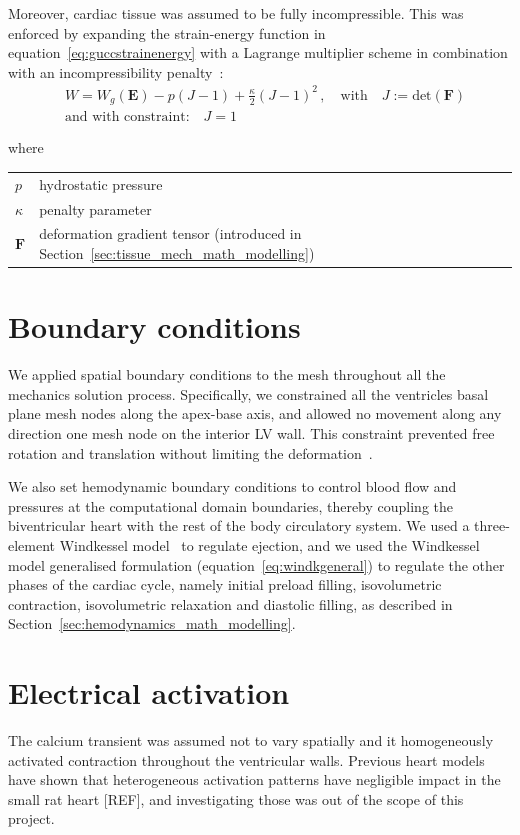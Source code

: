 \vspace{0.3cm}\noindent
Moreover, cardiac tissue was assumed to be fully incompressible. This was enforced by expanding the strain-energy function in equation~\eqref{eq:guccstrainenergy} with a Lagrange multiplier scheme in combination with an incompressibility penalty~\cite{Land:2015*b}:
%
\begin{align}\label{eq:landstrainenergy}
    &W = W_g(\mathbf{E}) - p(J - 1) + \frac{\kappa}{2}(J - 1)^2\,,\quad\text{with}\quad J:=\text{det}(\mathbf{F}) \\
    &\text{and with constraint:}\quad J=1
\end{align}

\noindent
where

\vspace{0.2cm}
\begin{tabular}{ll}
    $p$ & hydrostatic pressure \\
    $\kappa$ & penalty parameter \\
    $\mathbf{F}$ & deformation gradient tensor (introduced in Section~\ref{sec:tissue_mech_math_modelling})
\end{tabular}


%
%
%
\section{Boundary conditions}\label{sec:boundaryconditions}
We applied spatial boundary conditions to the mesh throughout all the mechanics solution process. Specifically, we constrained all the ventricles basal plane mesh nodes along the apex-base axis, and allowed no movement along any direction one mesh node on the interior LV wall. This constraint prevented free rotation and translation without limiting the deformation~\cite{Land:2012}.

\vspace{0.2cm}
We also set hemodynamic boundary conditions to control blood flow and pressures at the computational domain boundaries, thereby coupling the biventricular heart with the rest of the body circulatory system. We used a three-element Windkessel model~\cite{Westerhof:1971} to regulate ejection, and we used the Windkessel model generalised formulation (equation~\eqref{eq:windkgeneral}) to regulate the other phases of the cardiac cycle, namely initial preload filling, isovolumetric contraction, isovolumetric relaxation and diastolic filling, as described in Section~\ref{sec:hemodynamics_math_modelling}.


%
%
%
\section{Electrical activation}\label{sec:electricalactivation}
The calcium transient was assumed not to vary spatially and it homogeneously activated contraction throughout the ventricular walls. Previous heart models
have shown that heterogeneous activation patterns have negligible impact in the small rat heart [REF], and investigating those was out of the scope of this project.
